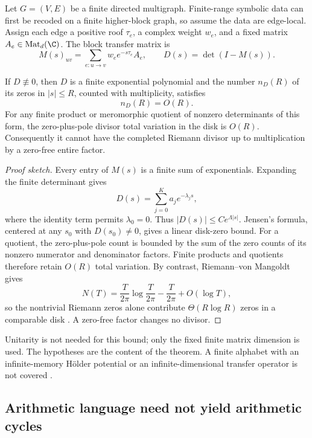 Let \(G=(V,E)\) be a finite directed multigraph.  Finite-range symbolic data
can first be recoded on a finite higher-block graph, so assume the data are
edge-local.  Assign each edge a positive roof \(\tau_e\), a complex weight
\(w_e\), and a fixed matrix \(A_e\in\operatorname{Mat}_d(\C)\).  The block
transfer matrix is
\[
  M(s)_{uv}=\sum_{e:u\to v} w_e e^{-s\tau_e}A_e,
  \qquad D(s)=\det(I-M(s)).
\]

\begin{theorem}
\label{thm:finite-memory}
If \(D\not\equiv0\), then \(D\) is a finite exponential polynomial and the
number \(n_D(R)\) of its zeros in \(\lvert s\rvert\le R\), counted with
multiplicity, satisfies
\[
  n_D(R)=O(R).
\]
For any finite product or meromorphic quotient of nonzero determinants of this
form, the zero-plus-pole divisor total variation in the disk is \(O(R)\).
Consequently it cannot have the completed Riemann divisor up to multiplication
by a zero-free entire factor.
\end{theorem}

\begin{proof}[Proof sketch]
Every entry of \(M(s)\) is a finite sum of exponentials.  Expanding the finite
determinant gives
\[
  D(s)=\sum_{j=0}^{K}a_j e^{-\lambda_j s},
\]
where the identity term permits \(\lambda_0=0\).  Thus
\(\lvert D(s)\rvert\le C e^{\Lambda\lvert s\rvert}\).  Jensen's formula,
centered at any \(s_0\) with \(D(s_0)\ne0\), gives a linear disk-zero bound.
For a quotient, the zero-plus-pole count is bounded by the sum of the zero
counts of its nonzero numerator and denominator factors.  Finite products and
quotients therefore retain \(O(R)\) total variation.  By contrast,
Riemann--von Mangoldt gives
\[
  N(T)=\frac{T}{2\pi}\log\frac{T}{2\pi}
       -\frac{T}{2\pi}+O(\log T),
\]
so the nontrivial Riemann zeros alone contribute
\(\Theta(R\log R)\) zeros in a comparable disk \citep{dlmf2510}.  A zero-free
factor changes no divisor.
\end{proof}

Unitarity is not needed for this bound; only the fixed finite matrix dimension
is used.  The hypotheses are the content of the theorem.  A finite alphabet with an
infinite-memory H\"older potential or an infinite-dimensional transfer
operator is not covered \citep{pollicott1986meromorphic}.

\subsection{Arithmetic language need not yield arithmetic cycles}

